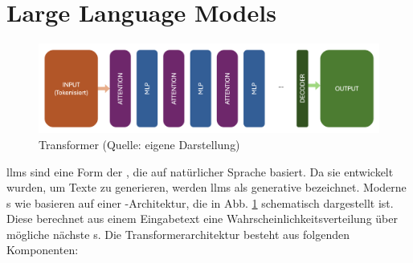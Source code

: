 \documentclass[../main.tex]{subfiles}
\begin{document}
\section{Large Language Models}
\label{sec:llm}

\begin{figure}[h!]
  \includegraphics[scale=0.37]{bilder/Transformer.png}
  \caption{Transformer (Quelle: eigene Darstellung)}
  \label{fig:trans}
\end{figure}

\glspl{llm} sind eine Form der , die auf natürlicher Sprache basiert. Da sie entwickelt wurden, um Texte zu generieren, werden \glspl{llm} als generative 
 bezeichnet. Moderne s wie  basieren auf einer -Architektur, die in Abb. \ref{fig:trans} schematisch dargestellt ist. Diese 
berechnet aus einem Eingabetext eine Wahrscheinlichkeitsverteilung über mögliche nächste s. Die Transformerarchitektur besteht aus folgenden Komponenten:\cite{architecture}
\end{document}
